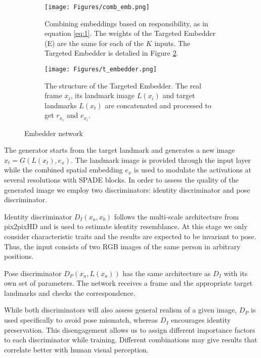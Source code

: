 \documentclass[11pt,a4paper]{article}
\begin{document}
\begin{figure}[!t]
\centering
\begin{subfigure}{0.57\textwidth}
    \texttt{[image: Figures/comb\_emb.png]}
    \caption{Combining embeddings based on responsibility, as in equation \eqref{eq:1}. The weights of the Targeted Embedder (E) are the same for each of the $K$ inputs. The Targeted Embedder is detalied in Figure \ref{fig:temb}.}
    \label{fig:comb_emb}
\end{subfigure}\hspace{0.04\textwidth}
\begin{subfigure}{0.37\textwidth}
    \texttt{[image: Figures/t\_embedder.png]}
        \caption{The structure of the Targeted Embedder. The real frame $x_i$, its landmark image $L(x_i)$ and target landmarks $L(x_t)$ are concatenated and processed to get $r_{x_i}$ and $e_{x_i}$.}
    \label{fig:temb}
\end{subfigure}
\caption[]{Embedder network}
\label{fig:embedder}
\end{figure}

The generator starts from the target landmark and generates a new image $\hat{x}_t = G(L(x_t), e_x)$. The landmark image is provided through the input layer while the combined spatial embedding $e_x$ is used to modulate the activations at several resolutions with SPADE blocks.
In order to assess the quality of the generated image we employ two discriminators: identity discriminator and pose discriminator.

Identity discriminator $D_I(x_a, x_b)$ follows the multi-scale architecture from pix2pixHD \cite{wang2018pix2pixHD} and is used to estimate identity resemblance. At this stage we only consider characteristic traits and the results are expected to be invariant to pose. Thus, the input consists of two RGB images of the same person in arbitrary positions.

Pose discriminator $D_P(x_a, L(x_a))$ has the same architecture as $D_I$ with its own set of parameters. The network receives a frame and the appropriate target landmarks and checks the correspondence.  

While both discriminators will also assess general realism of a given image, $D_P$ is used specifically to avoid pose mismatch, whereas $D_I$ encourages identity preservation. This disengagement allows us to assign different importance factors to each discriminator while training. Different combinations may give results that correlate better with human visual perception.
\end{document}
